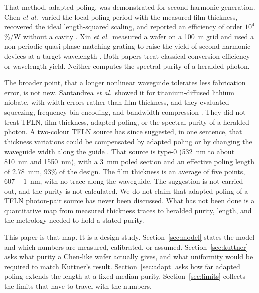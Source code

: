\documentclass[11pt,a4paper]{article}
\begin{document}
That method, adapted poling, was demonstrated for second-harmonic generation.
Chen \emph{et al.}\ varied the local poling period with the measured film thickness, recovered the ideal length-squared scaling, and reported an efficiency of order $10^{4}$\,\%/W without a cavity \cite{Chen2024}.
Xin \emph{et al.}\ measured a wafer on a 100~\textmu m grid and used a non-periodic quasi-phase-matching grating to raise the yield of second-harmonic devices at a target wavelength \cite{Xin2025}.
Both papers treat classical conversion efficiency or wavelength yield.
Neither computes the spectral purity of a heralded photon.

The broader point, that a longer nonlinear waveguide tolerates less fabrication error, is not new.
Santandrea \emph{et al.}\ showed it for titanium-diffused lithium niobate, with width errors rather than film thickness, and they evaluated squeezing, frequency-bin encoding, and bandwidth compression \cite{Santandrea2019}.
They did not treat TFLN, film thickness, adapted poling, or the spectral purity of a heralded photon.
A two-colour TFLN source has since suggested, in one sentence, that thickness variations could be compensated by adapted poling or by changing the waveguide width along the guide \cite{Babel2025,Chen2024,He2024}.
That source is type-0 (532~nm to about 810~nm and 1550~nm), with a 3~mm poled section and an effective poling length of 2.78~mm, 93\% of the design.
The film thickness is an average of five points, $607\pm 1$~nm, with no trace along the waveguide.
The suggestion is not carried out, and the purity is not calculated.
We do not claim that adapted poling of a TFLN photon-pair source has never been discussed.
What has not been done is a quantitative map from measured thickness traces to heralded purity, length, and the metrology needed to hold a stated purity.

This paper is that map.
It is a design study.
Section~\ref{sec:model} states the model and which numbers are measured, calibrated, or assumed.
Section~\ref{sec:kuttner} asks what purity a Chen-like wafer actually gives, and what uniformity would be required to match Kuttner's result.
Section~\ref{sec:adapt} asks how far adapted poling extends the length at a fixed median purity.
Section~\ref{sec:limits} collects the limits that have to travel with the numbers.
\end{document}
